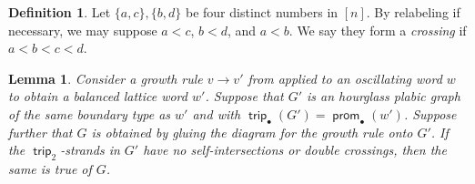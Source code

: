 \documentclass{amsart}
\newtheorem{lemma}[theorem]{Lemma}
\theoremstyle{definition}
\newtheorem{definition}[theorem]{Definition}
\theoremstyle{remark}
\numberwithin{equation}{section}
\DeclareMathOperator{\trip}{\mathsf{trip}}
\DeclareMathOperator{\prom}{\mathsf{prom}}
\begin{document}
\begin{definition}
  Let $\{a, c\}, \{b, d\}$ be four distinct numbers in $[n]$. By relabeling if necessary, we may suppose $a < c$, $b < d$, and $a < b$. We say they form a \emph{crossing} if $a < b < c < d$. 
\end{definition}

\begin{lemma}\label{lem:growth-rules-trip2}
Consider a growth rule $v \to v'$ from  applied to an oscillating word $w$ to obtain a balanced lattice word $w'$. Suppose that $G'$ is an hourglass plabic graph of the same boundary type as $w'$ and with $\trip_\bullet(G') = \prom_\bullet(w')$. Suppose further that $G$ is obtained by gluing the diagram for the growth rule onto $G'$. If the $\trip_2$-strands in $G'$ have no self-intersections or double crossings, then the same is true of $G$.
\end{lemma}
\end{document}
